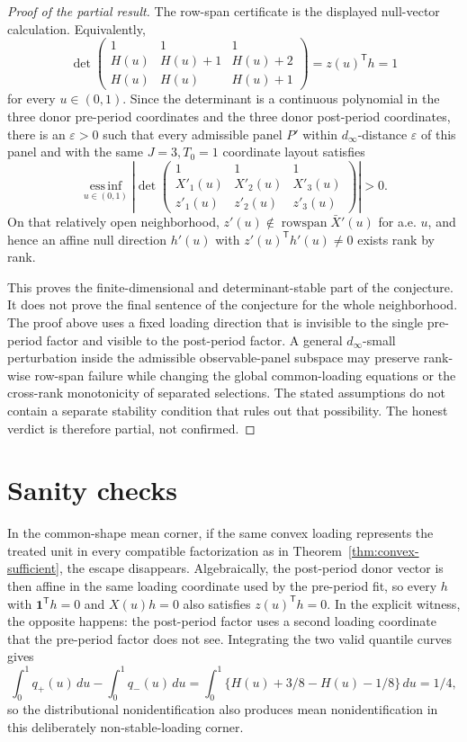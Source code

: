 \documentclass[11pt]{article}
\newcommand{\one}{\mathbf{1}}
\newcommand{\transpose}{\mathsf{T}}
\theoremstyle{definition}
\theoremstyle{plain}
\theoremstyle{remark}
\begin{document}
\begin{proof}[Proof of the partial result]
The row-span certificate is the displayed null-vector calculation.  Equivalently,
\[
\det\begin{pmatrix}
1&1&1\\
H(u)&H(u)+1&H(u)+2\\
H(u)&H(u)&H(u)+1
\end{pmatrix}
=z(u)^\transpose h=1
\]
for every \(u\in(0,1)\).  Since the determinant is a continuous polynomial in the three donor pre-period coordinates and the three donor post-period coordinates, there is an \(\varepsilon>0\) such that every admissible panel \(P'\) within \(d_\infty\)-distance \(\varepsilon\) of this panel and with the same \(J=3,T_0=1\) coordinate layout satisfies
\[
\operatorname*{ess\,inf}_{u\in(0,1)}
\left|
\det\begin{pmatrix}
1&1&1\\
X'_1(u)&X'_2(u)&X'_3(u)\\
z'_1(u)&z'_2(u)&z'_3(u)
\end{pmatrix}
\right|>0.
\]
On that relatively open neighborhood, \(z'(u)\notin\operatorname{rowspan}\bar X'(u)\) for a.e. \(u\), and hence an affine null direction \(h'(u)\) with \(z'(u)^\transpose h'(u)\ne0\) exists rank by rank.

This proves the finite-dimensional and determinant-stable part of the conjecture.  It does not prove the final sentence of the conjecture for the whole neighborhood.  The proof above uses a fixed loading direction that is invisible to the single pre-period factor and visible to the post-period factor.  A general \(d_\infty\)-small perturbation inside the admissible observable-panel subspace may preserve rank-wise row-span failure while changing the global common-loading equations or the cross-rank monotonicity of separated selections.  The stated assumptions do not contain a separate stability condition that rules out that possibility.  The honest verdict is therefore partial, not confirmed.
\end{proof}

\section{Sanity checks}
In the common-shape mean corner, if the same convex loading represents the treated unit in every compatible factorization as in Theorem~\ref{thm:convex-sufficient}, the escape disappears.  Algebraically, the post-period donor vector is then affine in the same loading coordinate used by the pre-period fit, so every \(h\) with \(\one^\transpose h=0\) and \(X(u)h=0\) also satisfies \(z(u)^\transpose h=0\).  In the explicit witness, the opposite happens: the post-period factor uses a second loading coordinate that the pre-period factor does not see.  Integrating the two valid quantile curves gives
\[
\int_0^1 q_+(u)\,du-\int_0^1 q_-(u)\,du
=\int_0^1\{H(u)+3/8-H(u)-1/8\}\,du
=1/4,
\]
so the distributional nonidentification also produces mean nonidentification in this deliberately non-stable-loading corner.
\end{document}
